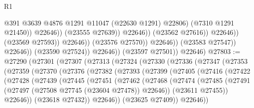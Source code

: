 \begin{lexlean}{R1}
\begin{coremodule}
                                                    @391
                                                    @3639
                                                    @4876
                                                    @1291
                                                    @11047
                                                    (@22630 @1291)
                                                    @22806)
                                                  (@7310 @1291 @21450))
                                                @22646))
                                            (@23555 @27639))
                                          @22646))
                                      (@23562 @27616))
                                    @22646))
                                (@23569 @27593))
                              @22646))
                          (@23576 @27570))
                        @22646))
                    (@23583 @27547))
                  @22646))
              (@23590 @27524))
            @22646))
        (@23597 @27501))
      @22646)
@27803 := @27290
    (@27301
      (@27307
        (@27313
          (@27324
            (@27330
              (@27336
                (@27347
                  (@27353
                    (@27359
                      (@27370
                        (@27376
                          (@27382
                            (@27393
                              (@27399
                                (@27405
                                  (@27416
                                    (@27422
                                      (@27428
                                        (@27439
                                          (@27445
                                            (@27451
                                              (@27462
                                                (@27468
                                                  (@27474
                                                    (@27485
                                                      (@27491
                                                        (@27497
                                                          (@27508 @27745 (@23604 @27478))
                                                          @22646))
                                                      (@23611 @27455))
                                                    @22646))
                                                (@23618 @27432))
                                              @22646))
                                          (@23625 @27409))
                                        @22646))

\end{coremodule}
\end{lexlean}

